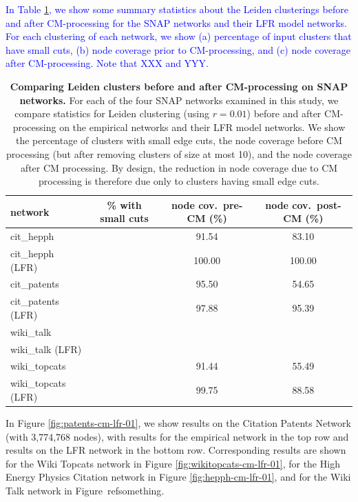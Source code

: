 \documentclass[11pt]{article}   	%
\begin{document}
\textcolor{blue}{In Table \ref{tab:LFR-vs-empirical-SNAP}, we show some summary statistics about the  Leiden clusterings before and after CM-processing for the SNAP networks and their LFR model networks.  For each clustering of each network, we  show (a) percentage of input clusters that have small cuts, (b) node coverage prior to CM-processing, and (c) node coverage after CM-processing.  Note that
XXX and YYY.}


\begin{table}[ht]
\centering
\begin{tabular}{lccc}
  \hline
 network & \% with small cuts & node cov.~pre-CM (\%) & node cov.~post-CM (\%) \\
  \hline
  cit\_hepph  &  & 91.54 & 83.10 \\
  cit\_hepph (LFR) &  & 100.00 & 100.00 \\
  \hline
  cit\_patents & & 95.50 & 54.65\\
    cit\_patents  (LFR) & & 97.88 & 95.39\\
  \hline
  wiki\_talk & & & \\
    wiki\_talk (LFR) & & & \\
  \hline
  wiki\_topcats & & 91.44 & 55.49 \\
   wiki\_topcats  (LFR)& & 99.75 & 88.58 \\
   \hline
\end{tabular}
\caption{\textbf{Comparing Leiden clusters before and after CM-processing  on SNAP networks.} For each of the four SNAP networks
examined in this study, we compare statistics for Leiden clustering (using $r=0.01$) before and after CM-processing on the empirical networks and their LFR model
networks. We show the percentage of clusters with small edge cuts, the node coverage before CM processing (but after removing clusters of size at most 10), and the node coverage
after CM processing.  By design, the reduction in node coverage due to CM processing  is therefore due only to clusters having small edge cuts.}
\label{tab:LFR-vs-empirical-SNAP}
\end{table}



In Figure \ref{fig:patents-cm-lfr-01}, we show results on the Citation Patents Network  (with 3,774,768 nodes), with results for the
empirical  network in the top row and results on the LFR network in the bottom row.
Corresponding results are shown for the Wiki Topcats network in Figure \ref{fig:wikitopcats-cm-lfr-01}, for the High Energy Physics Citation network
in Figure \ref{fig:hepph-cm-lfr-01}, and for the Wiki Talk network in Figure\ ref{something}.
\end{document}
